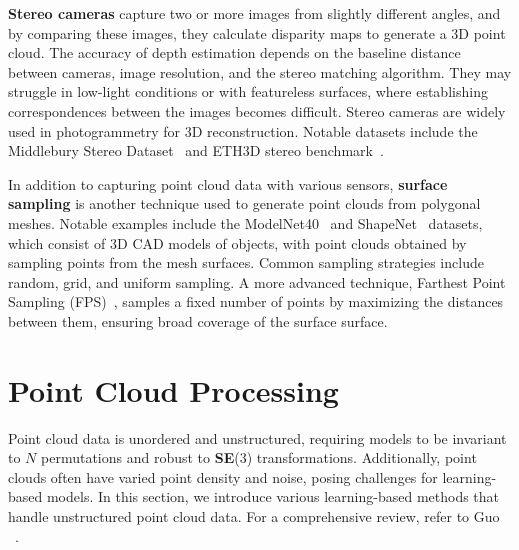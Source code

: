 \textbf{Stereo cameras} capture two or more images from slightly different angles, and by comparing these images, they calculate disparity maps to generate a 3D point cloud. The accuracy of depth estimation depends on the baseline distance between cameras, image resolution, and the stereo matching algorithm. They may struggle in low-light conditions or with featureless surfaces, where establishing correspondences between the images becomes difficult. Stereo cameras are widely used in photogrammetry for 3D reconstruction. Notable datasets include the Middlebury Stereo Dataset~\cite{scharstein2002taxonomy} and ETH3D stereo benchmark~\cite{schops2017multi}.

In addition to capturing point cloud data with various sensors, \textbf{surface sampling} is another technique used to generate point clouds from polygonal meshes. Notable examples include the ModelNet40~\cite{wu2015ModelNet} and ShapeNet~\cite{chang2015shapenet} datasets, which consist of 3D CAD models of objects, with point clouds obtained by sampling points from the mesh surfaces. Common sampling strategies include random, grid, and uniform sampling. A more advanced technique, Farthest Point Sampling (FPS)~\cite{qi2017pointnet++}, samples a fixed number of points by maximizing the distances between them, ensuring broad coverage of the surface surface.

\section{Point Cloud Processing}
\label{sec:bg_pc_process}
Point cloud data is unordered and unstructured, requiring models to be invariant to $N\!$ permutations and robust to \textbf{SE}(3) transformations. Additionally, point clouds often have varied point density and noise, posing challenges for learning-based models. In this section, we introduce various learning-based methods that handle unstructured point cloud data. For a comprehensive review, refer to Guo \etal~\cite{guo2020deep}.


